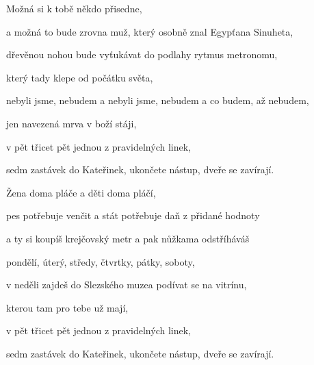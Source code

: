 \zs
Možná si k tobě někdo přisedne,

a možná to bude zrovna muž, který osobně znal Egypťana Sinuheta,

dřevěnou nohou bude vyťukávat do podlahy rytmus metronomu,

který tady klepe od počátku světa,

nebyli jsme, nebudem a nebyli jsme, nebudem a co budem, až nebudem,

jen navezená mrva v boží stáji,

v pět třicet pět jednou z pravidelných linek,

sedm zastávek do Kateřinek, ukončete nástup, dveře se zavírají.
\ks

\zs
Žena doma pláče a děti doma pláčí,

pes potřebuje venčit a stát potřebuje daň z přidané hodnoty

a ty si koupíš krejčovský metr a pak nůžkama odstříháváš

pondělí, úterý, středy, čtvrtky, pátky, soboty,

v neděli zajdeš do Slezského muzea podívat se na vitrínu,

kterou tam pro tebe už mají,

v pět třicet pět jednou z pravidelných linek,

sedm zastávek do Kateřinek, ukončete nástup, dveře se zavírají.
\ks

\kp





